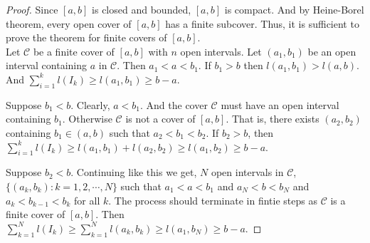 \begin{enumerate}
\begin{proof}
	Since $[a,b]$ is closed and bounded, $[a,b]$ is compact.
	And by Heine-Borel theorem, every open cover of $[a,b]$ has a finite subcover.
	Thus, it is sufficient to prove the theorem for finite covers of $[a,b]$.\\

	Let $\mathcal{C}$ be a finite cover of $[a,b]$ with $n$ open intervals.
	Let $(a_1,b_1)$ be an open interval containing $a$ in $\mathcal{C}$.
	Then $a_1 < a < b_1$.
	If $b_1 > b$ then $l(a_1,b_1) > l(a,b)$.
	And $\displaystyle\sum_{i=1}^k l(I_k) \ge l(a_1,b_1) \ge b-a$.

\begin{center}
\end{center}

	Suppose $b_1 < b$.
	Clearly, $a < b_1$.
	And the cover $\mathcal{C}$ must have an open interval containing $b_1$.
	Otherwise $\mathcal{C}$ is not a cover of $[a,b]$.
	That is, there exists $(a_2,b_2)$ containing $b_1 \in (a,b)$ such that $a_2 < b_1 < b_2$.
	If $b_2 > b$, then $\displaystyle\sum_{i=1}^k l(I_k) \ge l(a_1,b_1) + l(a_2,b_2) \ge l(a_1,b_2) \ge b-a$.

\begin{center}
\end{center}

	Suppose $b_2 < b$.
	Continuing like this we get, $N$ open intervals in $\mathcal{C}$, $\{ (a_k,b_k) : k = 1,2,\cdots,N \} $ such that $a_1 < a < b_1$ and $a_N < b < b_N$ and $a_k < b_{k-1} < b_k$ for all $k$.
	The process should terminate in fintie steps as $\mathcal{C}$ is a finite cover of $[a,b]$.
	Then $\displaystyle\sum_{k=1}^N l(I_k) \ge \displaystyle\sum_{k=1}^N l(a_k,b_k) \ge l(a_1,b_N) \ge b-a$.


\end{proof}
\end{enumerate}
